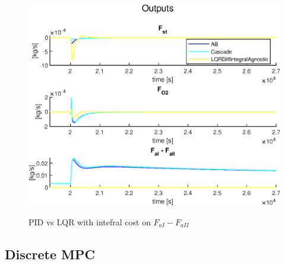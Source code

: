 \begin{figure}
    \includegraphics[width=\textwidth]{img/Fig_dump/inputs_ABCascadeLQRDiffIntegralAgnosticStep_Q_all.eps}
    \label{fig:integrall_diff_cost_inputs}
    \caption{PID vs LQR with intefral cost on $F_{aI} - F_{aII}$}
\end{figure}



\subsection{Discrete MPC}

